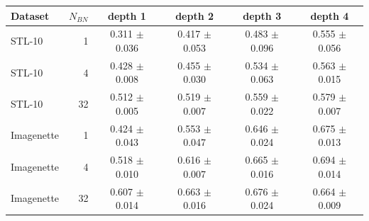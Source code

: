 \begin{tabular}{lrcccc}
\toprule
Dataset & $N_{BN}$ & depth 1 & depth 2 & depth 3 & depth 4 \\
\midrule
STL-10 & 1 & 0.311 $\pm$ 0.036 & 0.417 $\pm$ 0.053 & 0.483 $\pm$ 0.096 & 0.555 $\pm$ 0.056 \\
STL-10 & 4 & 0.428 $\pm$ 0.008 & 0.455 $\pm$ 0.030 & 0.534 $\pm$ 0.063 & 0.563 $\pm$ 0.015 \\
STL-10 & 32 & 0.512 $\pm$ 0.005 & 0.519 $\pm$ 0.007 & 0.559 $\pm$ 0.022 & 0.579 $\pm$ 0.007 \\
Imagenette & 1 & 0.424 $\pm$ 0.043 & 0.553 $\pm$ 0.047 & 0.646 $\pm$ 0.024 & 0.675 $\pm$ 0.013 \\
Imagenette & 4 & 0.518 $\pm$ 0.010 & 0.616 $\pm$ 0.007 & 0.665 $\pm$ 0.016 & 0.694 $\pm$ 0.014 \\
Imagenette & 32 & 0.607 $\pm$ 0.014 & 0.663 $\pm$ 0.016 & 0.676 $\pm$ 0.024 & 0.664 $\pm$ 0.009 \\
\bottomrule
\end{tabular}
